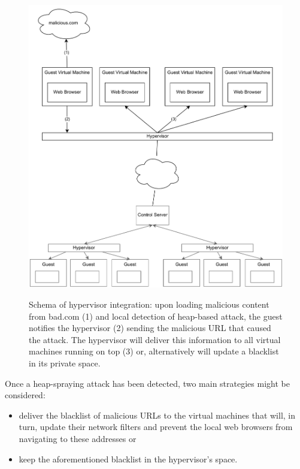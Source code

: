 \begin{figure}[t]
\begin{center}
\includegraphics[scale=0.55]{images/virtualDesktop.pdf}
\caption{{Schema of hypervisor integration: upon loading malicious content from bad.com (1) and local detection of  heap-based attack, the guest notifies the hypervisor (2) sending the malicious URL that caused the attack. The hypervisor will deliver this information to all virtual machines running on top (3) or, alternatively will update a blacklist in its private space.}}
\vspace{0.3cm}
\label{virtualdesktop}
\end{center}
\end{figure}


Once a heap-spraying attack has been detected, two main strategies might be considered:  

\begin{itemize}
\item deliver the blacklist of malicious URLs to the virtual machines that will, in turn, update their network filters and prevent the local web browsers from navigating to these addresses or 

\item keep the aforementioned blacklist in the hypervisor's space. 
\end{itemize}

